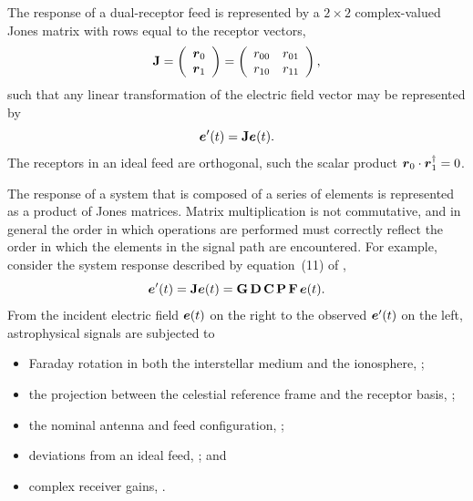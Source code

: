The response of a dual-receptor feed 
is represented by a $2\times2$ complex-valued
Jones matrix with rows equal to the receptor vectors,
\begin{equation}
\label{eqn:feed}
{\bf J}=\left( \begin{array}{c}
	\mbox{\boldmath $r$}_0 \\
    \mbox{\boldmath $r$}_1
\end{array} \right)
=
  \left( \begin{array}{cc}
    r_{00} & r_{01} \\
    r_{10} & r_{11}
  \end{array} \right),
\end{equation}
%
such that any linear transformation of the electric field vector may be represented by
%
\begin{equation}
\mbox{\boldmath $e$}'(t)={\bf J}\mbox{\boldmath $e$}(t).
\label{eqn:field_transformation}
\end{equation}
%
The receptors in an ideal feed are orthogonal, such the scalar product $\mbox{\boldmath $r$}_0 \cdot \mbox{\boldmath $r$}_1^\dagger=0$.

The response of a system that is composed of a series of elements is represented as a product of Jones matrices.
%
Matrix multiplication is not commutative, and in general the order in which operations are performed
must correctly reflect the order in which the elements in the signal path are encountered.
%
For example, consider the system response described by equation~(11) of \citet{hbs96},
%
\begin{equation}
\mbox{\boldmath $e$}'(t) = {\bf J} \mbox{\boldmath $e$}(t) = {\bf G\, D\, C\, P\, F}\, \mbox{\boldmath $e$}(t).
\label{eqn:chain}
\end{equation}
%
From the incident electric field $\mbox{\boldmath $e$}(t)$ on the right to the 
observed $\mbox{\boldmath $e$}'(t)$ on the left, astrophysical signals are subjected to

\begin{itemize}
\item Faraday rotation in both the interstellar medium and the ionosphere, ;
\item the projection between the celestial reference frame and the receptor basis, ;
\item the nominal antenna and feed configuration, ;
\item deviations from an ideal feed, ; and
\item complex receiver gains, .
\end{itemize}

